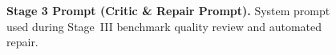 \begin{figure}[p]
\begin{tcolorbox}[
    enhanced,
    colback=gray!5,
    colframe=black!60,
    arc=2pt,
    boxrule=0.5pt,
    width=\linewidth,
    left=6pt, right=6pt, top=0pt, bottom=16pt,
    parbox=false,
]
\begin{minipage}[t]{0.477\linewidth}
\end{minipage}

\end{tcolorbox}
\caption{\textbf{Stage 3 Prompt (Critic \& Repair Prompt).} System prompt used during Stage~III benchmark quality review and automated repair.}
\label{fig:critic-prompt}
\end{figure}
